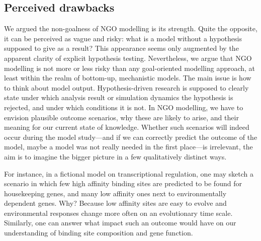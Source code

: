 \subsection{Perceived drawbacks}

We argued the non-goalness of NGO modelling is its strength. Quite the opposite, it can be perceived as vague and risky: what is a model without a hypothesis supposed to give as a result? This appearance seems only augmented by the apparent clarity of explicit hypothesis testing. Nevertheless, we argue that NGO modelling is not more or less risky than any goal-oriented modelling approach, at least within the realm of bottom-up, mechanistic models. The main issue is how to think about model output. Hypothesis-driven research is supposed to clearly state under which analysis result or simulation dynamics the hypothesis is rejected, and under which conditions it is not. In NGO modelling, we have to envision plausible outcome scenarios, why these are likely to arise, and their meaning for our current state of knowledge. Whether such scenarios will indeed occur during the model study---and if we can correctly predict the outcome of the model, maybe a model was not really needed in the first place---is irrelevant, the aim is to imagine the bigger picture in a few qualitatively distinct ways.

For instance, in a fictional model on transcriptional regulation, one may sketch a scenario in which few high affinity binding sites are predicted to be found for housekeeping genes, and many low affinity ones next to environmentally dependent genes. Why? Because low affinity sites are easy to evolve and environmental responses change more often on an evolutionary time scale. Similarly, one can answer what impact such an outcome would have on our understanding of binding site composition and gene function.